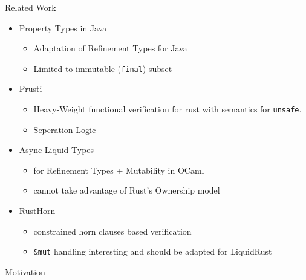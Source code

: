 \documentclass{sdqbeamer}
\begin{document}
\begin{frame}{Related Work}
  \begin{itemize}
    \item Property Types in Java\cite{lanzinger_property_2021}
      \begin{itemize}
        \item Adaptation of Refinement Types for Java
        \item Limited to immutable (\texttt{final}) subset
      \end{itemize}
    \item Prusti\cite{astrauskas_leveraging_2019}
      \begin{itemize} 
        \item Heavy-Weight functional verification for rust with semantics for \texttt{unsafe}.
        \item Seperation Logic
      \end{itemize}
    \item Async Liquid Types\cite{kloos_asynchronous_2015}
      \begin{itemize} 
        \item for Refinement Types + Mutability in OCaml
        \item cannot take advantage of Rust's Ownership model
      \end{itemize}
    \item RustHorn\cite{matsushita_rusthorn_2020}
      \begin{itemize} 
        \item constrained horn clauses based verification
        \item \texttt{\&mut} handling interesting and should be adapted for LiquidRust
      \end{itemize}
  \end{itemize}
\end{frame}




\begin{frame}[fragile=singleslide]{Motivation}


\end{frame}
\end{document}
